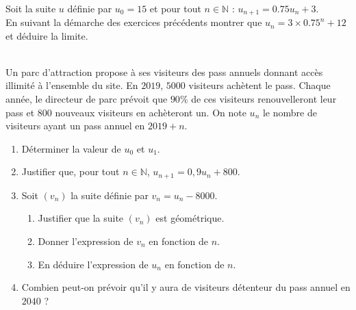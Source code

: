 \documentclass[main.tex]{subfiles}
\begin{document}
\begin{exercise}[entrainement]\label{chapter05:exercise:suites34}  \hfill \\
Soit la suite $u$ définie par $u_0=15$ et pour tout $n\in\mathbb{N}$ : $u_{n+1}=0.75 u_n + 3$. \\
En suivant la démarche des exercices précédents montrer que $u_n=3\times 0.75^n+12$ et déduire la limite. 
\end{exercise}
\begin{exercise}\label{chapter05:exercise:suites35} \hfill \\
Un parc d'attraction propose à ses visiteurs des pass annuels donnant accès illimité à l'ensemble du site. En $2019$, $5000$ visiteurs achètent le pass. Chaque année, le directeur de parc prévoit que $90\%$ de ces visiteurs renouvelleront leur pass et $800$ nouveaux visiteurs en achèteront un. On note $u_n$ le nombre de visiteurs ayant un pass annuel en $2019+n$.
\begin{enumerate}[label=\arabic*),leftmargin=*] 
	\item Déterminer la valeur de $u_0$ et $u_1$.
	\item Justifier que, pour tout $n \in \mathbb{N}$, $u_{n+1}=0,9u_n+800$.
	\item Soit $(v_n)$ la suite définie par $v_n=u_n-8000$.
	\begin{enumerate}[label=\alph*),leftmargin=*] 
		\item Justifier que la suite $(v_n)$ est géométrique.
		\item Donner l'expression de $v_n$ en fonction de $n$.
		\item En déduire l'expression de $u_n$ en fonction de $n$.
	\end{enumerate}
	\item Combien peut-on prévoir qu'il y aura de visiteurs détenteur du pass annuel en $2040$ ?
\end{enumerate}
\end{exercise}
\end{document}

